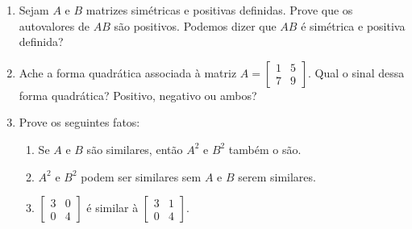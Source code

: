 \documentclass[leqno]{article}
\numberwithin{equation}{section}
\begin{document}
\begin{enumerate}

\item Sejam $A$ e $B$ matrizes simétricas e positivas definidas. Prove que os autovalores de $AB$ são positivos. Podemos dizer que $AB$ é simétrica e positiva definida?

\begin{sol} 
\end{sol} 


\item Ache a forma quadrática associada à matriz $A = \begin{bmatrix}
1 & 5 \\
7 & 9
\end{bmatrix}$. Qual o sinal dessa forma quadrática? Positivo, negativo ou ambos?

\begin{sol} 
\end{sol} 


\item Prove os seguintes fatos:

\begin{enumerate}

\item Se $A$ e $B$ são similares, então $A^2$ e $B^2$ também o são.

\begin{sol} 
\end{sol} 

\item $A^2$ e $B^2$ podem ser similares sem $A$ e $B$ serem similares.

\item $\begin{bmatrix}
3 & 0 \\
0 & 4
\end{bmatrix}$ é similar à $\begin{bmatrix}
3 & 1 \\
0 & 4
\end{bmatrix}$.


\end{enumerate}
\end{enumerate}
\end{document}
